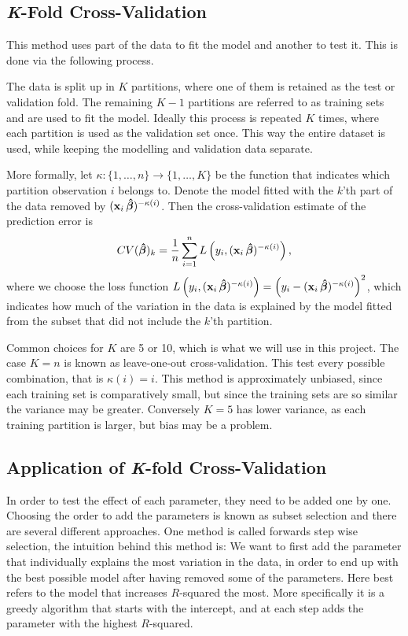 \subsection{\textit{K}-Fold Cross-Validation} 

This method uses part of the data to fit the model and another to test it. This is done via the following process.

The data is split up in $K$ partitions, where one of them is retained as the test or validation fold. 
The remaining $K-1$ partitions are referred to as training sets and are used to fit the model.
Ideally this process is repeated $K$ times, where each partition is used as the validation set once. 
This way the entire dataset is used, while keeping the modelling and validation data separate. 

More formally, let $\kappa: \{1, \ldots, n\} \rightarrow \{1, \ldots, K\}$ be the function that indicates which partition observation $i$ belongs to. 
Denote the model fitted with the $k$'th part of the data removed by $(\textbf{x}_i \operatorname{\boldsymbol{\hat{\beta}}})^{-\kappa(i)}$. 
Then the cross-validation estimate of the prediction error is 
\begin{align*}
    CV(\operatorname{\boldsymbol{\hat{\beta}}})_k = \frac{1}{n} \sum_{i=1}^n L\left(y_i, (\textbf{x}_i \operatorname{\boldsymbol{\hat{\beta}}})^{-\kappa(i)}\right),
\end{align*}
where we choose the loss function $L\left(y_i, (\textbf{x}_i \operatorname{\boldsymbol{\hat{\beta}}})^{-\kappa(i)}\right)=\left(y_i - (\textbf{x}_i \operatorname{\boldsymbol{\hat{\beta}}})^{-\kappa(i)}\right)^2$, which indicates how much of the variation in the data is explained by the model fitted from the subset that did not include the $k$'th partition. 

Common choices for $K$ are 5 or 10, which is what we will use in this project. 
The case $K = n$ is known as leave-one-out cross-validation. 
This test every possible combination, that is $\kappa(i) = i$. 
This method is approximately unbiased, since each training set is comparatively small, but since the training sets are so similar the variance may be greater. 
Conversely $K=5$ has lower variance, as each training partition is larger, but bias may be a problem. 


\subsection{Application of \textit{K}-fold Cross-Validation}
In order to test the effect of each parameter, they need to be added one by one. 
Choosing the order to add the parameters is known as subset selection and there are several different approaches.
One method is called forwards step wise selection, the intuition behind this method is:
We want to first add the parameter that individually explains the most variation in the data, in order to end up with the best possible model after having removed some of the parameters.
Here best refers to the model that increases $R$-squared the most.
More specifically it is a greedy algorithm that starts with the intercept, and at each step adds the parameter with the highest $R$-squared.

